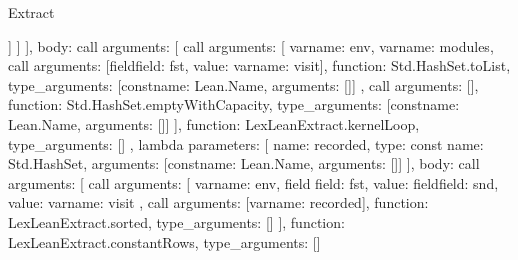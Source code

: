 \begin{lexlean}{Extract}
\begin{toolingmodule}
{{{{{{{{{{{{                                    }
                                  ]
                                }
                              ]
                            }
                          }
                        ],
                        body: call{
                          arguments: [
                            call{
                              arguments: [
                                var{name: env},
                                var{name: modules},
                                call{
                                  arguments: [field{field: fst, value: var{name: visit}}],
                                  function: Std.HashSet.toList,
                                  type_arguments: [const{name: Lean.Name, arguments: []}]
                                },
                                call{
                                  arguments: [],
                                  function: Std.HashSet.emptyWithCapacity,
                                  type_arguments: [const{name: Lean.Name, arguments: []}]
                                }
                              ],
                              function: LexLeanExtract.kernelLoop,
                              type_arguments: []
                            },
                            lambda{
                              parameters: [
                                {
                                  name: recorded,
                                  type: const{
                                    name: Std.HashSet,
                                    arguments: [const{name: Lean.Name, arguments: []}]
                                  }
                                }
                              ],
                              body: call{
                                arguments: [
                                  call{
                                    arguments: [
                                      var{name: env},
                                      field{
                                        field: fst,
                                        value: field{field: snd, value: var{name: visit}}
                                      },
                                      call{
                                        arguments: [var{name: recorded}],
                                        function: LexLeanExtract.sorted,
                                        type_arguments: []
                                      }
                                    ],
                                    function: LexLeanExtract.constantRows,
                                    type_arguments: []
}}}}}}}}}}}}
\end{toolingmodule}
\end{lexlean}
